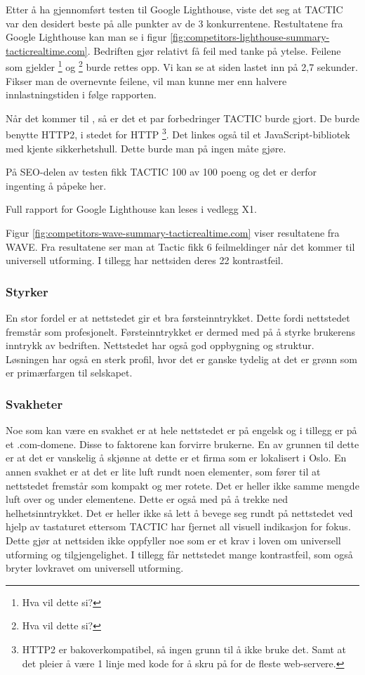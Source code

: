 Etter å ha gjennomført testen til Google Lighthouse, viste det seg at TACTIC var den desidert beste på alle punkter av de 3 konkurrentene. Restultatene fra Google Lighthouse kan man se i figur \ref{fig:competitors-lighthouse-summary-tacticrealtime.com}. Bedriften gjør relativt få feil med tanke på ytelse. Feilene som gjelder \footnote{Hva vil dette si?} og \footnote{Hva vil dette si?} burde rettes opp. Vi kan se at siden lastet inn på 2,7 sekunder. Fikser man de overnevnte feilene, vil man kunne mer enn halvere innlastningstiden i følge rapporten.

Når det kommer til , så er det et par forbedringer TACTIC burde gjort. De burde benytte HTTP2, i stedet for HTTP \footnote{HTTP2 er bakoverkompatibel, så ingen grunn til å ikke bruke det. Samt at det pleier å være 1 linje med kode for å skru på for de fleste web-servere.}. Det linkes også til et JavaScript-bibliotek med kjente sikkerhetshull. Dette burde man på ingen måte gjøre.

På SEO-delen av testen fikk TACTIC 100 av 100 poeng og det er derfor ingenting å påpeke her.

Full rapport for Google Lighthouse kan leses i vedlegg X1.

Figur \ref{fig:competitors-wave-summary-tacticrealtime.com} viser resultatene fra WAVE. Fra resultatene ser man at Tactic fikk 6 feilmeldinger når det kommer til universell utforming. I tillegg har nettsiden deres 22 kontrastfeil. 

\subsubsection{Styrker}
En stor fordel er at nettstedet gir et bra førsteinntrykket. Dette fordi nettstedet fremstår som profesjonelt. Førsteinntrykket er dermed med på å styrke brukerens inntrykk av bedriften. Nettstedet har også god oppbygning og struktur. Løsningen har også en sterk profil, hvor det er ganske tydelig at det er grønn som er primærfargen til selskapet.

\subsubsection{Svakheter}
Noe som kan være en svakhet er at hele nettstedet er på engelsk og i tillegg er på et .com-domene. Disse to faktorene kan forvirre brukerne. En av grunnen til dette er at det er vanskelig å skjønne at dette er et firma som er lokalisert i Oslo. En annen svakhet er at det er lite luft rundt noen elementer, som fører til at nettstedet fremstår som kompakt og mer rotete. Det er heller ikke samme mengde luft over og under elementene. Dette er også med på å trekke ned helhetsinntrykket. Det er heller ikke så lett å bevege seg rundt på nettstedet ved hjelp av tastaturet ettersom TACTIC har fjernet all visuell indikasjon for fokus. Dette gjør at nettsiden ikke oppfyller noe som er et krav i loven om universell utforming og tilgjengelighet. I tillegg får nettstedet mange kontrastfeil, som også bryter lovkravet om universell utforming.

